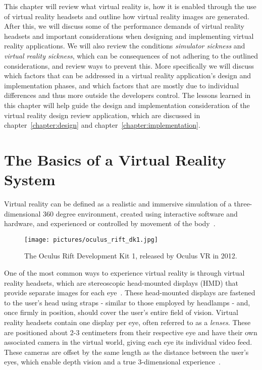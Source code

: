 This chapter will review what virtual reality is, how it is enabled through the use of virtual reality headsets and 
outline how virtual reality images are generated. After this, we will discuss some of the performance demands of virtual reality headsets 
and important considerations when designing and implementing virtual reality applications. 
We will also review the conditions \textit{simulator sickness} and \textit{virtual reality sickness}, which can be consequences of not adhering 
to the outlined considerations, and review ways to prevent this. More specifically we will discuss which factors that can be addressed in a virtual reality application's design and 
implementation phases, and which factors that are mostly due to individual differences and thus more outside the developers control. 
The lessons learned in this chapter will help guide the design and implementation consideration of the virtual reality design review application, which 
are discussed in chapter~\ref{chapter:design} and chapter~\ref{chapter:implementation}.


\section{The Basics of a Virtual Reality System}
\label{sec:vr_basics}
Virtual reality can be defined as a realistic and immersive simulation of a three-dimensional 360 degree environment, 
created using interactive software and hardware, and experienced or controlled by movement of the body~\citep{VRS2016}.

\begin{figure}%
	\texttt{[image: pictures/oculus\_rift\_dk1.jpg]}
	\caption[The Oculus Rift Development Kit 1]{The Oculus Rift Development Kit 1, released by Oculus VR in 2012.}
	\label{fig:oculus}
\end{figure}

One of the most common ways to experience virtual reality is through virtual reality headsets, which are stereoscopic head-mounted displays (HMD) 
that provide separate images for each eye~\citep{POLYGON2016}. These head-mounted displays are fastened to the user's head using straps - similar to those employed by 
headlamps - and, once firmly in position, should cover the user's entire field of vision. 
Virtual reality headsets contain one display per eye, often referred to as a \textit{lenses}. These are positioned about 2-3 centimeters from their respective eye and have their own
associated camera in the virtual world, giving each eye its individual video feed. These cameras are offset by the same length as the distance between the user's eyes,
which enable depth vision and a true 3-dimensional experience~\citep{Abrash2012}. 


